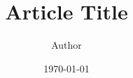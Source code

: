 \documentclass[11pt,a4paper]{amsart}
\title{Article Title}
\author{Author}
\date{\today}
\theoremstyle{definition}
\theoremstyle{remark}
\numberwithin{equation}{section}
\begin{document}
\begin{abstract}
  \noindent
\end{abstract}

\maketitle




\end{document}
